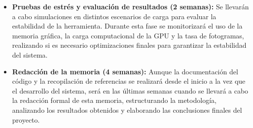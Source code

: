 \begin{itemize}
    \item \textbf{Pruebas de estrés y evaluación de resultados (2 semanas):} Se llevarán a cabo simulaciones en distintos escenarios de carga para evaluar la estabilidad de la herramienta. Durante esta fase se monitorizará el uso de la memoria gráfica, la carga computacional de la GPU y la tasa de fotogramas, realizando si es necesario optimizaciones finales para garantizar la estabilidad del sistema.

    \item \textbf{Redacción de la memoria (4 semanas):} Aunque la documentación del código y la recopilación de referencias se realizará desde el inicio a la vez que el desarrollo del sistema, será en las últimas semanas cuando se llevará a cabo la redacción formal de esta memoria, estructurando la metodología, analizando los resultados obtenidos y elaborando las conclusiones finales del proyecto.

\end{itemize}

